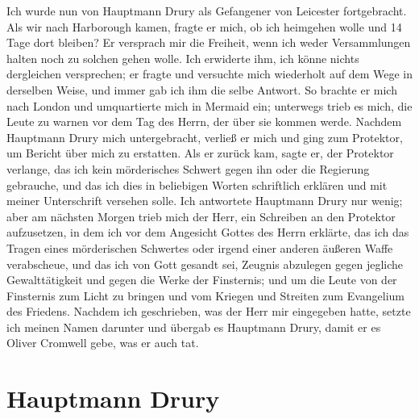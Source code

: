 Ich wurde nun von Hauptmann Drury als Gefangener von
Leicester fortgebracht. Als wir nach Harborough kamen, fragte
er mich, ob ich heimgehen wolle und 14 Tage dort bleiben? Er
versprach mir die Freiheit, wenn ich weder Versammlungen halten
noch zu solchen gehen wolle. Ich erwiderte ihm, ich könne nichts
dergleichen versprechen; er fragte und versuchte mich wiederholt
auf dem Wege in derselben Weise, und immer gab ich ihm die
selbe Antwort. So brachte er mich nach London und umquartierte
mich in Mermaid ein; unterwegs trieb es mich, die Leute zu
warnen vor dem Tag des Herrn, der über sie kommen werde.
Nachdem Hauptmann Drury mich untergebracht, verließ er mich
und ging zum Protektor, um Bericht über mich zu erstatten. Als
er zurück kam, sagte er, der Protektor verlange, das ich kein
mörderisches Schwert gegen ihn oder die Regierung gebrauche,
und das ich dies in beliebigen Worten schriftlich erklären und mit
meiner Unterschrift versehen solle. Ich antwortete Hauptmann
Drury nur wenig; aber am nächsten Morgen trieb mich der Herr,
ein Schreiben an den Protektor aufzusetzen, in dem ich vor dem
Angesicht Gottes des Herrn erklärte, das ich das Tragen eines
mörderischen Schwertes oder irgend einer anderen 
äußeren Waffe
verabscheue, und das ich von Gott gesandt sei, Zeugnis 
abzulegen gegen jegliche Gewalttätigkeit und gegen die Werke der
Finsternis; und um die Leute von der Finsternis zum Licht zu
bringen und vom Kriegen und Streiten zum Evangelium des
Friedens. Nachdem ich geschrieben, was der Herr mir eingegeben
hatte, setzte ich meinen Namen darunter 
und übergab es Hauptmann Drury, damit er es Oliver Cromwell gebe, 
was er auch tat. 

\section{Hauptmann Drury}

